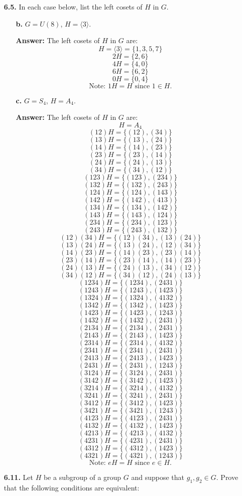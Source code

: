 \documentclass[12pt,reqno]{amsart}
\newcommand{\probskip}{\vskip1cm}
\begin{document}
\begin{enumerate}[{\bf 1.}]
\item[{\bf 6.5.}]
In each case below, list the left cosets of $H$ in $G$.
\begin{enumerate}
\item[{\bf b.}]
$G = U(8)$, $H = \langle 3 \rangle$.

\textbf{Answer:} The left cosets of $H$ in $G$ are:
\[
H = \langle 3 \rangle = \{1, 3, 5, 7\}
\]
\[
2H = \{2, 6\}
\]
\[
4H = \{4, 0\}
\]
\[
6H = \{6, 2\}
\]
\[
0H = \{0, 4\}
\]
\[
\text{Note: } 1H = H \text{ since } 1 \in H.
\]

\item[{\bf c.}]
$G = S_4$, $H = A_4$.

\textbf{Answer:} The left cosets of $H$ in $G$ are:
\[
H = A_4
\]
\[
(12)H = \{(12), (34)\}
\]
\[
(13)H = \{(13), (24)\}
\]
\[
(14)H = \{(14), (23)\}
\]
\[
(23)H = \{(23), (14)\}
\]
\[
(24)H = \{(24), (13)\}
\]
\[
(34)H = \{(34), (12)\}
\]
\[
(123)H = \{(123), (234)\}
\]
\[
(132)H = \{(132), (243)\}
\]
\[
(124)H = \{(124), (143)\}
\]
\[
(142)H = \{(142), (413)\}
\]
\[
(134)H = \{(134), (142)\}
\]
\[
(143)H = \{(143), (124)\}
\]
\[
(234)H = \{(234), (123)\}
\]
\[
(243)H = \{(243), (132)\}
\]
\[
(12)(34)H = \{(12)(34), (13)(24)\}
\]
\[
(13)(24)H = \{(13)(24), (12)(34)\}
\]
\[
(14)(23)H = \{(14)(23), (23)(14)\}
\]
\[
(23)(14)H = \{(23)(14), (14)(23)\}
\]
\[
(24)(13)H = \{(24)(13), (34)(12)\}
\]
\[
(34)(12)H = \{(34)(12), (24)(13)\}
\]
\[
(1234)H = \{(1234), (2431)\}
\]
\[
(1243)H = \{(1243), (1423)\}
\]
\[
(1324)H = \{(1324), (4132)\}
\]
\[
(1342)H = \{(1342), (1423)\}
\]
\[
(1423)H = \{(1423), (1243)\}
\]
\[
(1432)H = \{(1432), (2431)\}
\]
\[
(2134)H = \{(2134), (2431)\}
\]
\[
(2143)H = \{(2143), (1423)\}
\]
\[
(2314)H = \{(2314), (4132)\}
\]
\[
(2341)H = \{(2341), (2431)\}
\]
\[
(2413)H = \{(2413), (1423)\}
\]
\[
(2431)H = \{(2431), (1243)\}
\]
\[
(3124)H = \{(3124), (2431)\}
\]
\[
(3142)H = \{(3142), (1423)\}
\]
\[
(3214)H = \{(3214), (4132)\}
\]
\[
(3241)H = \{(3241), (2431)\}
\]
\[
(3412)H = \{(3412), (1423)\}
\]
\[
(3421)H = \{(3421), (1243)\}
\]
\[
(4123)H = \{(4123), (2431)\}
\]
\[
(4132)H = \{(4132), (1423)\}
\]
\[
(4213)H = \{(4213), (4132)\}
\]
\[
(4231)H = \{(4231), (2431)\}
\]
\[
(4312)H = \{(4312), (1423)\}
\]
\[
(4321)H = \{(4321), (1243)\}
\]
\[
\text{Note: } eH = H \text{ since } e \in H.
\]

\end{enumerate}

\probskip

\item[{\bf 6.11.}] 
Let $H$ be a subgroup of a group $G$ and suppose that $g_1, g_2 \in G$.  Prove
that the following conditions are equivalent: 
\begin{enumerate}
 

\end{enumerate}
\end{enumerate}
\end{document}
